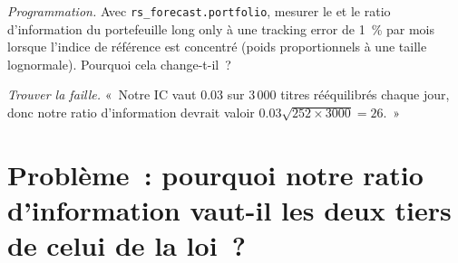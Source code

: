 \begin{exercise}[$\star\star\star$]\label{exo:rs:from-signal-to-forecast:7}
\emph{Programmation.} Avec \texttt{rs\_forecast.portfolio}, mesurer le  et le ratio d'information du portefeuille long only à une tracking
error de 1~\% par mois lorsque l'indice de référence est concentré (poids proportionnels à une taille lognormale). Pourquoi cela change-t-il~?
\end{exercise}

\begin{exercise}[$\star\star\star$]\label{exo:rs:from-signal-to-forecast:8}
\emph{Trouver la faille.} «~Notre IC vaut 0.03 sur 3\,000 titres rééquilibrés chaque jour, donc notre ratio d'information devrait valoir $0.03\sqrt{252 \times 3000} = 26$.~»
\end{exercise}

\section{Problème~: pourquoi notre ratio d'information vaut-il les deux tiers de celui de la loi~?}

